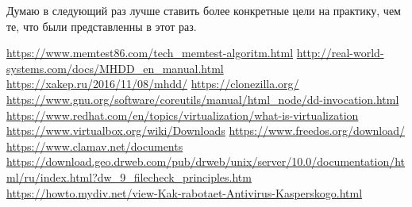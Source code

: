 \documentclass[a4paper,14pt]{extarticle}
\begin{document}
Думаю в следующий раз лучше ставить более конкретные цели на практику, чем те, что были представленны в этот раз.
\newpage
\begin{thebibliography}{}
	\url{https://www.memtest86.com/tech_memtest-algoritm.html}
	\url{http://real-world-systems.com/docs/MHDD_en_manual.html}
	\url{https://xakep.ru/2016/11/08/mhdd/}
  \url{https://clonezilla.org/}
  \url{https://www.gnu.org/software/coreutils/manual/html_node/dd-invocation.html}
  \url{https://www.redhat.com/en/topics/virtualization/what-is-virtualization}
  \url{https://www.virtualbox.org/wiki/Downloads}
  \url{https://www.freedos.org/download/}
  \url{https://www.clamav.net/documents}
  \url{https://download.geo.drweb.com/pub/drweb/unix/server/10.0/documentation/html/ru/index.html?dw_9_filecheck_principles.htm}
  \url{https://howto.mydiv.net/view-Kak-rabotaet-Antivirus-Kasperskogo.html}
\end{thebibliography}

\newpage
\end{document}
